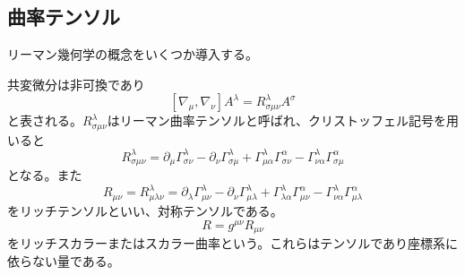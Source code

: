
\subsection{曲率テンソル}
    リーマン幾何学の概念をいくつか導入する。

    共変微分は非可換であり
        \[[\nabla_\mu, \nabla_\nu]A^\lambda = R^\lambda_{\sigma\mu\nu}A^\sigma\]
    と表される。$R^\lambda_{\sigma\mu\nu}$はリーマン曲率テンソルと呼ばれ、クリストッフェル記号を用いると
        \[R^\lambda_{\sigma\mu\nu} = \partial_\mu \Gamma^\lambda_{\sigma\nu} - \partial_\nu \Gamma^\lambda_{\sigma\mu} + \Gamma^\lambda_{\mu\alpha}\Gamma^\alpha_{\sigma\nu} - \Gamma^\lambda_{\nu\alpha}\Gamma^\alpha_{\sigma\mu}\]
    となる。また
        \[R_{\mu\nu} = R^\lambda_{\mu\lambda\nu} = \partial_\lambda \Gamma^\lambda_{\mu\nu} - \partial_\nu \Gamma^\lambda_{\mu\lambda} + \Gamma^\lambda_{\lambda\alpha}\Gamma^\alpha_{\mu\nu} - \Gamma^\lambda_{\nu\alpha}\Gamma^\alpha_{\mu\lambda}\]
    をリッチテンソルといい、対称テンソルである。
        \[R = g^{\mu\nu}R_{\mu\nu}\]
    をリッチスカラーまたはスカラー曲率という。これらはテンソルであり座標系に依らない量である。

